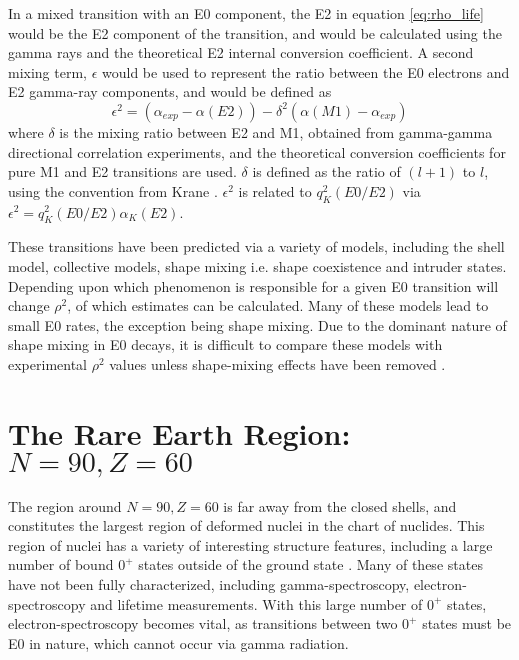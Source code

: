 In a mixed transition with an E0 component, the E2 in equation \ref{eq:rho_life} would be the E2 component of the transition, and would be calculated using the gamma rays and the theoretical E2 internal conversion coefficient\citep{church58:_monopole}. A second mixing term, $\epsilon$ would be used to represent the ratio between the E0 electrons and E2 gamma-ray components, and would be defined as 
\begin{equation}
\label{eq:epsilon}
    \epsilon^2=(\alpha_{exp}-\alpha(E2))-\delta^2(\alpha(M1)-\alpha_{exp})
\end{equation}
where $\delta$ is the mixing ratio between E2 and M1, obtained from gamma-gamma directional correlation experiments, and the theoretical conversion coefficients for pure M1 and E2 transitions are used. $\delta$ is defined as the ratio of $(l+1)$ to $l$, using the convention from Krane \citep{krane70:_delta_mixing}. $\epsilon^2$ is related to $q_K^2(E0/E2)$ via $\epsilon^2=q_K^2(E0/E2)\alpha_K(E2)$. 

These transitions have been predicted via a variety of models, including the shell model, collective models, shape mixing i.e. shape coexistence and intruder states\citep{wood99:_e0}. Depending upon which phenomenon is responsible for a given E0 transition will change $\rho^2$, of which estimates can be calculated. Many of these models lead to small E0 rates, the exception being shape mixing. Due to the dominant nature of shape mixing in E0 decays, it is difficult to compare these models with experimental $\rho^2$ values unless shape-mixing effects have been removed \citep{wood99:_e0}.

\section{The Rare Earth Region: $N=90,Z=60$}
\label{sec:rare_earth}

The region around $N=90,Z=60$ is far away from the closed shells, and constitutes the largest region of deformed nuclei in the chart of nuclides. This region of nuclei has a variety of interesting structure features, including a large number of bound $0^+$ states outside of the ground state \citep{meyer06:_zeroplus}. Many of these states have not been fully characterized, including gamma-spectroscopy, electron-spectroscopy and lifetime measurements. With this large number of $0^+$ states, electron-spectroscopy becomes vital, as transitions between two $0^+$ states must be E0 in nature, which cannot occur via gamma radiation.

